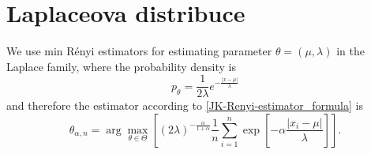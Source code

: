 \chapter{Laplaceova distribuce}


We use min R\'{e}nyi estimators for estimating parameter $\theta = (\mu,\lambda)$ in the Laplace family, where the probability density is 
\begin{equation}
	p_\theta = \frac{1}{2\lambda} e^{-\frac{|x-\mu|}{\lambda}}
\end{equation}
and therefore the estimator according to \eqref{JK-Renyi-estimator_formula} is 
\begin{equation}
	\theta_{\alpha,n} = \arg \max_{\theta \in \Theta} \left[ (2\lambda)^{-\frac{\alpha}{1+\alpha}} \frac{1}{n} \sum_{i=1}^n \exp \left[-\alpha\frac{|x_i-\mu|}{\lambda} \right] \right].
\end{equation}


